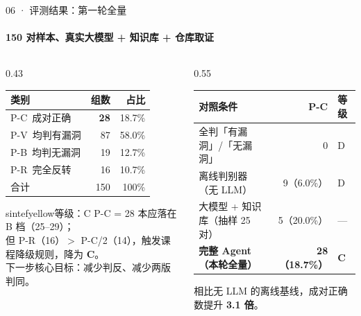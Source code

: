\documentclass{beamer}
\begin{document}
\begin{frame}{06 · 评测结果：第一轮全量}
\framesubtitle{150 对样本、真实大模型 + 知识库 + 仓库取证}
\scriptsize
\begin{columns}[t]
\begin{column}{0.43\textwidth}
\begin{tabular}{@{}lrr@{}}
\toprule
\textbf{类别} & \textbf{组数} & \textbf{占比} \\
\midrule
P-C\ 成对正确 & \textbf{28} & 18.7\% \\
P-V\ 均判有漏洞 & 87 & 58.0\% \\
P-B\ 均判无漏洞 & 19 & 12.7\% \\
P-R\ 完全反转 & 16 & 10.7\% \\
\midrule
合计 & 150 & 100\% \\
\bottomrule
\end{tabular}

\vspace{0.5em}
\begin{colorblock}[black]{sintefyellow}{等级：C}
\tiny
P-C = 28 本应落在 B 档（25--29）；\\
但 P-R（16）$>$ P-C/2（14），触发课程降级规则，降为 \textbf{C}。\\
下一步核心目标：减少判反、减少两版判同。
\end{colorblock}
\end{column}
\begin{column}{0.55\textwidth}
\centering
{}

\vspace{1.1em}
\begin{tabular}{@{}lrl@{}}
\toprule
\textbf{对照条件} & \textbf{P-C} & \textbf{等级} \\
\midrule
全判「有漏洞」/「无漏洞」 & 0 & D \\
离线判别器（无 LLM） & 9（6.0\%） & D \\
大模型 + 知识库（抽样 25 对） & 5（20.0\%） & --- \\
\textbf{完整 Agent（本轮全量）} & \textbf{28（18.7\%）} & \textbf{C} \\
\bottomrule
\end{tabular}

\vspace{0.4em}
{\tiny 相比无 LLM 的离线基线，成对正确数提升 \textbf{3.1 倍}。}
\end{column}
\end{columns}
\end{frame}
\end{document}

